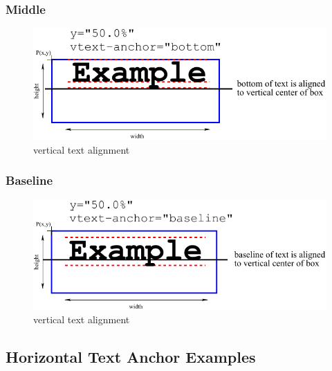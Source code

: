 \clearpage

\subsubsection{Middle}

\begin{figure}[h!]
\begin{center}
\includegraphics{figures/VerticalTextPlacement4.pdf}
\end{center}
\caption{vertical text alignment }
\label{VerticalTextPlacement4}
\end{figure}

\subsubsection{Baseline}

\begin{figure}[h!]
\begin{center}
\includegraphics{figures/VerticalTextPlacement5.pdf}
\end{center}
\caption{vertical text alignment }
\label{VerticalTextPlacement5}
\end{figure}

\clearpage

\subsection{Horizontal Text Anchor Examples}

